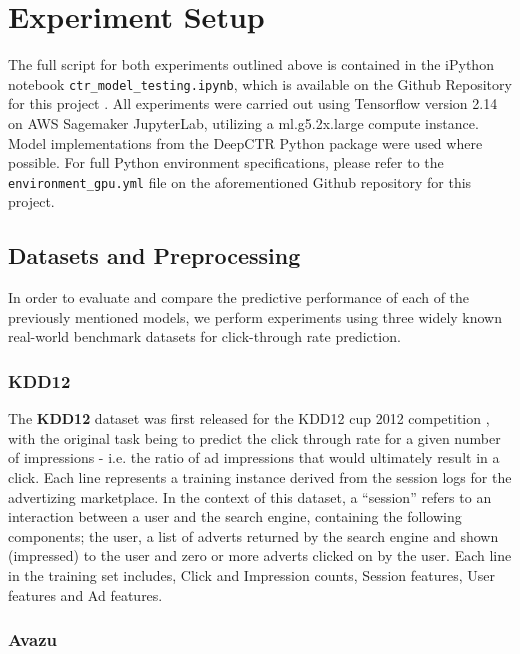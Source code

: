 \documentclass{mldsmsc}
\begin{document}
\section{Experiment Setup}
\label{sec:experiment-setup}

The full script for both experiments outlined above is contained in the iPython notebook
\verb|ctr_model_testing.ipynb|, which is available on the Github Repository for this project \citep{Batek_Deep_Reinforcement_Leaning_2024}.
All experiments were carried out using Tensorflow version 2.14 on AWS Sagemaker JupyterLab, utilizing a ml.g5.2x.large compute instance.
Model implementations from the DeepCTR Python package \citep{RefWorks:shen2017deepctr:} were
used where possible. For full Python environment specifications, please refer to the
\verb|environment_gpu.yml| file on the aforementioned Github repository for this project.

\subsection{Datasets and Preprocessing}

In order to evaluate and compare the predictive performance of each of the previously mentioned
models, we perform experiments using three widely known real-world benchmark datasets for
click-through rate prediction.

\subsubsection{KDD12}

The \textbf{KDD12} dataset was first released for the KDD12 cup 2012 competition
\citep{RefWorks:aden2012kdd}, with the original task being to predict the 
click through rate for a given number of impressions - i.e. the ratio of ad impressions
that would ultimately result in a click. Each line represents 
a training instance derived from the session logs for the advertizing 
marketplace. In the context of this dataset, a ``session'' refers to an 
interaction between a user and the search engine, containing the following 
components; the user, a list of adverts returned by the search engine and 
shown (impressed) to the user and zero or more adverts clicked on by the 
user. Each line in the training set includes, Click and Impression counts, 
Session features, User features and Ad features.

\subsubsection{Avazu}
\end{document}
